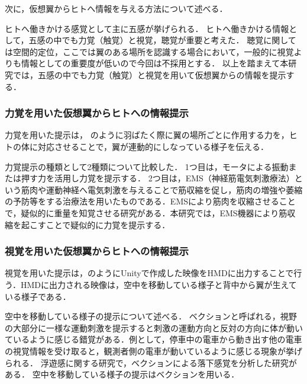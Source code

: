 

    次に，仮想翼からヒトへ情報を与える方法について述べる．

    ヒトへ働きかける感覚として主に五感が挙げられる．
    ヒトへ働きかける情報として，五感の中でも力覚（触覚）と視覚，聴覚が重要と考えた．
    聴覚に関しては空間的定位，ここでは翼のある場所を認識する場合において，一般的に視覚よりも情報としての重要度が低い\cite{岡嶋克典20182}ので今回は不採用とする．
    以上を踏まえて本研究では，五感の中でも力覚（触覚）と視覚を用いて仮想翼からの情報を提示する．

    \subsubsection{力覚を用いた仮想翼からヒトへの情報提示}

        力覚を用いた提示は，
        のように羽ばたく際に翼の場所ごとに作用する力を，ヒトの体に対応させることで，翼が連動的にしなっている様子を伝える．

        力覚提示の種類として2種類について比較した．
        1つ目は，モータによる振動または押す力を活用し力覚を提示する．
        2つ目は，EMS（神経筋電気刺激療法）という筋肉や運動神経へ電気刺激を与えることで筋収縮を促し，筋肉の増強や萎縮の予防等をする治療法を用いたものである．EMSにより筋肉を収縮させることで，疑似的に重量を知覚させる研究がある\cite{小川剛史2017電気的筋肉刺激が重量知覚に及ぼす影響の分析}．本研究では，EMS機器により筋収縮を起こすことで疑似的に力覚を提示する．
    
    \subsubsection{視覚を用いた仮想翼からヒトへの情報提示}
 
        視覚を用いた提示は，のようにUnityで作成した映像をHMDに出力することで行う．HMDに出力される映像は，空中を移動している様子と背中から翼が生えている様子である．

        空中を移動している様子の提示について述べる．
        ベクションと呼ばれる，視野の大部分に一様な運動刺激を提示すると刺激の運動方向と反対の方向に体が動いているように感じる錯覚がある\cite{妹尾武治2014ベクションとその周辺の近年の動向}．例として，停車中の電車から動き出す他の電車の視覚情報を受け取ると，観測者側の電車が動いているように感じる現象が挙げられる．
        浮遊感に関する研究で，ベクションによる落下感覚を分析した研究がある\cite{奥川夏輝2017VR空間における視覚刺激によって発生する落下感覚の分析}．
        空中を移動している様子の提示はベクションを用いる．

